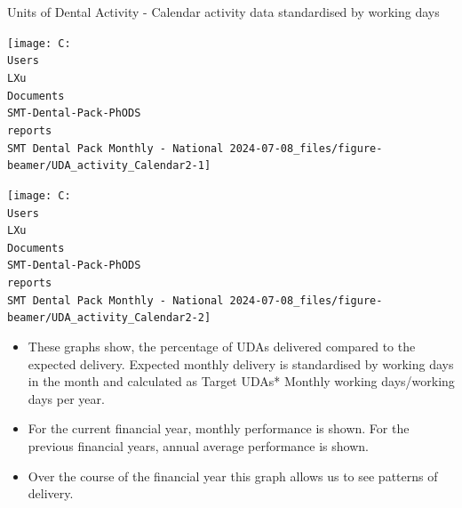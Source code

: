 \documentclass[
  8pt,
  ignorenonframetext,
  aspectratio = 169]{beamer}
\providecommand{\tightlist}{%
  \setlength{\itemsep}{0pt}\setlength{\parskip}{0pt}}
\begin{document}
\begin{frame}{Units of Dental Activity - Calendar activity data
standardised by working days}
\protect\hypertarget{units-of-dental-activity---calendar-activity-data-standardised-by-working-days}{}
\begin{center}\texttt{[image: C:\\Users\\LXu\\Documents\\SMT-Dental-Pack-PhODS\\reports\\SMT Dental Pack Monthly - National 2024-07-08\_files/figure-beamer/UDA\_activity\_Calendar2-1]} \end{center}

\begin{center}\texttt{[image: C:\\Users\\LXu\\Documents\\SMT-Dental-Pack-PhODS\\reports\\SMT Dental Pack Monthly - National 2024-07-08\_files/figure-beamer/UDA\_activity\_Calendar2-2]} \end{center}

\begin{itemize}
\tightlist
\item
  These graphs show, the percentage of UDAs delivered compared to the
  expected delivery. Expected monthly delivery is standardised by
  working days in the month and calculated as Target UDAs* Monthly
  working days/working days per year.
\item
  For the current financial year, monthly performance is shown. For the
  previous financial years, annual average performance is shown.
\item
  Over the course of the financial year this graph allows us to see
  patterns of delivery.
\end{itemize}
\end{frame}
\end{document}
